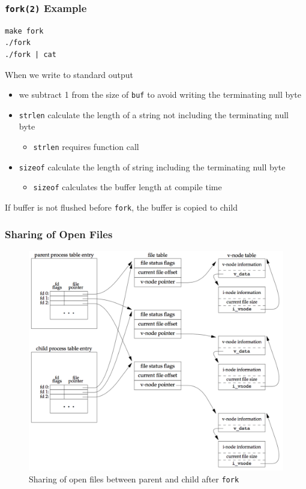 \documentclass[newPxFont,sthlmFooter,nooffset]{beamer}
\begin{document}
\begin{frame}
  \frametitle{\texttt{fork(2)} Example}

\begin{verbatim}
make fork
./fork
./fork | cat 
\end{verbatim}

When we write to standard output
\begin{itemize}
\item we subtract 1 from the size of \texttt{buf} to avoid writing the terminating null byte
\item \texttt{strlen} calculate the length of a string not including the terminating null byte
  \begin{itemize}
  \item \footnotesize \texttt{strlen} requires function call
  \end{itemize}
\item \texttt{sizeof} calculate the length of string including the terminating null byte
  \begin{itemize}
  \item \footnotesize \texttt{sizeof} calculates the buffer length at compile time
  \end{itemize}
\end{itemize}

If buffer is not flushed before \texttt{fork}, the buffer is copied to child
\end{frame}

\begin{frame}
  \frametitle{Sharing of Open Files}
  \begin{figure}[h]
    \centering
    \includegraphics[height=0.9\textheight]{figure/fig8-2_sharing.png}
    \caption{Sharing of open files between parent and child after \texttt{fork}}
  \end{figure}
\end{frame}
\end{document}
